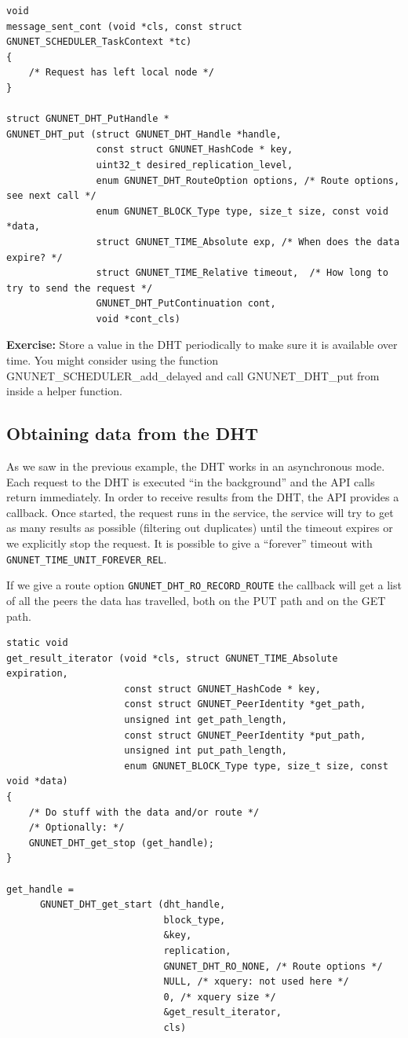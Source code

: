 \documentclass[10pt]{article}
\newcommand{\exercise}[1]{\noindent\begin{boxedminipage}{\textwidth}{\bf Exercise:} #1 \end{boxedminipage}}
\begin{document}
\lstset{language=C}
\begin{lstlisting}
void
message_sent_cont (void *cls, const struct GNUNET_SCHEDULER_TaskContext *tc)
{
    /* Request has left local node */
}

struct GNUNET_DHT_PutHandle *
GNUNET_DHT_put (struct GNUNET_DHT_Handle *handle, 
                const struct GNUNET_HashCode * key,
                uint32_t desired_replication_level,
                enum GNUNET_DHT_RouteOption options, /* Route options, see next call */
                enum GNUNET_BLOCK_Type type, size_t size, const void *data,
                struct GNUNET_TIME_Absolute exp, /* When does the data expire? */
                struct GNUNET_TIME_Relative timeout,  /* How long to try to send the request */
                GNUNET_DHT_PutContinuation cont,
                void *cont_cls)
\end{lstlisting}

\exercise{Store a value in the DHT periodically to make sure it is available
over time. You might consider using the function GNUNET\_SCHEDULER\_add\_delayed and
call GNUNET\_DHT\_put from inside a helper function.}


\subsection{Obtaining data from the DHT}
As we saw in the previous example, the DHT works in an asynchronous mode.
Each request to the DHT is executed ``in the background'' and the API
calls return immediately. In order to receive results from the DHT, the
API provides a callback. Once started, the request runs in the service,
the service will try to get as many results as possible (filtering out
duplicates) until the timeout expires or we explicitly stop the request.
It is possible to give a ``forever'' timeout with
{\tt GNUNET\_TIME\_UNIT\_FOREVER\_REL}.

If we give a route option {\tt GNUNET\_DHT\_RO\_RECORD\_ROUTE} the callback
will get a list of all the peers the data has travelled, both on the PUT
path and on the GET path.
\lstset{language=C}
\begin{lstlisting}
static void
get_result_iterator (void *cls, struct GNUNET_TIME_Absolute expiration,
                     const struct GNUNET_HashCode * key,
                     const struct GNUNET_PeerIdentity *get_path,
                     unsigned int get_path_length,
                     const struct GNUNET_PeerIdentity *put_path,
                     unsigned int put_path_length,
                     enum GNUNET_BLOCK_Type type, size_t size, const void *data)
{
    /* Do stuff with the data and/or route */
    /* Optionally: */
    GNUNET_DHT_get_stop (get_handle);
}

get_handle =
      GNUNET_DHT_get_start (dht_handle,
                            block_type,
                            &key,
                            replication,
                            GNUNET_DHT_RO_NONE, /* Route options */
                            NULL, /* xquery: not used here */
                            0, /* xquery size */
                            &get_result_iterator,
                            cls)
\end{lstlisting}
\end{document}
